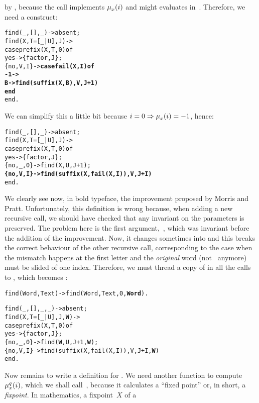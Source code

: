  by ,
because the call  implements \(\mu_{x}^{}(i)\)
and might evaluates in~. Therefore, we need a
 construct:
\begin{alltt}
find(_,     [],_) -> absent;
find(X,T=[_|U],J) ->
  case prefix(X,T,0) of
    yes      -> \{factor,J\};
    \{no,V,I\} -> \textbf{case fail(X,I) of}\hfill% fail(X,I) \emph{is} \(\MPfailure{x}{}{i}\)
                  \textbf{-1 -> 
                   B -> find(suffix(X,B),V,J+1)
                 end}
  end.
\end{alltt}
We can simplify this a little bit because \(i = 0 \Rightarrow
\mu_{x}^{}(i) = -1\), hence:
\begin{alltt}
find(_,     [],_) -> absent;
find(X,T=[_|U],J) ->
  case prefix(X,T,0) of
    yes      -> \{factor,J\};
    \{no,_,0\} -> find(X,U,J+1);
    \textbf{\{no,V,I\} -> find(suffix(X,fail(X,I)),V,J+I)}
  end.
\end{alltt}
We clearly see now, in bold typeface, the improvement proposed by
Morris and Pratt. Unfortunately, this definition is wrong because,
when adding a new recursive call, we should have checked that any
invariant on the parameters is preserved. The problem here is the
first argument,~, which was invariant before the addition
of the improvement. Now, it changes sometimes into
 and this breaks the correct behaviour of
the other recursive call, corresponding to the case when the mismatch
happens at the first letter and the \emph{original} word
(not~ anymore) must be slided of one index. Therefore, we
must thread a copy of  in all the calls to
, which becomes :
\begin{alltt}
find(Word,Text) -> find(Word,Text,0,\textbf{Word}).\hfill% \emph{Copy of} Word

find(_,     [],_,_) -> absent;
find(X,T=[_|U],J,\textbf{W}) ->\hfill% W \emph{is the original} Word
  case prefix(X,T,0) of
    yes      -> \{factor,J\};
    \{no,_,0\} -> find(\textbf{W},U,J+1,\textbf{W});\hfill% \emph{Sliding} W \emph{by one}
    \{no,V,I\} -> find(suffix(X,fail(X,I)),V,J+I,\textbf{W})
  end.
\end{alltt}
Now remains to write a definition for . We need
another function to compute \(\mu_{x}^{q}(i)\), which we shall
call~, because it calculates a ``fixed point'' or, in
short, a \emph{fixpoint}. In mathematics, a fixpoint~\(X\) of a
